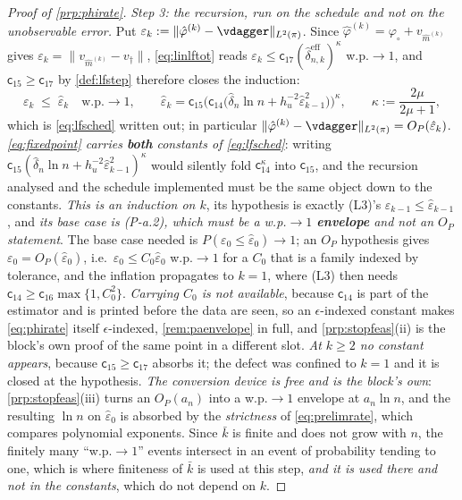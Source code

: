 \begin{proof}[Proof of \cref{prp:phirate}]
\emph{Step 3: the recursion, run on the schedule and not on the unobservable error.} Put
$\varepsilon_k:=\|\hat\varphi^{(k)}-\vdagger\|_{L^{2}(\pi)}$. Since
$\hat\varphi^{(k)}=\varphi_\circ+v_{\hat m^{(k)}}$ gives $\varepsilon_k=\|v_{\hat m^{(k)}}-v_\dagger\|$,
\eqref{eq:linlftot} reads $\varepsilon_k\le\mathsf c_{17}(\hat\delta^{\mathrm{eff}}_{n,k})^{\kappa}$
w.p.$\to1$, and $\mathsf c_{15}\ge\mathsf c_{17}$ by \cref{def:lfstep} therefore closes the induction:
\begin{equation}\label{eq:fixedpoint}
\varepsilon_k\;\le\;\hat\varepsilon_k\quad\text{w.p.}\to1,
\qquad
\hat\varepsilon_k=\mathsf c_{15}\Big(\mathsf c_{14}\big(\hat\delta_n\ln n+h_u^{-2}\hat\varepsilon_{k-1}^{2}\big)\Big)^{\kappa},
\qquad \kappa:=\frac{2\mu}{2\mu+1} ,
\end{equation}
which is \eqref{eq:lfsched} written out; in particular
$\|\hat\varphi^{(k)}-\vdagger\|_{L^{2}(\pi)}=O_P(\hat\varepsilon_k)$.
\emph{\eqref{eq:fixedpoint} carries \textbf{both} constants of \eqref{eq:lfsched}}: writing
$\mathsf c_{15}(\hat\delta_n\ln n+h_u^{-2}\hat\varepsilon_{k-1}^{2})^{\kappa}$ would silently fold
$\mathsf c_{14}^{\kappa}$ into $\mathsf c_{15}$, and the recursion analysed and the
schedule implemented must be the same object down to the constants.
\emph{This is an induction on $k$}, its hypothesis is exactly (L3)'s
$\varepsilon_{k-1}\le\hat\varepsilon_{k-1}$, and \emph{its base case is (P-a.2), which must be a
w.p.$\to1$ \textbf{envelope} and not an $O_P$ statement}. The base case needed is
$P(\varepsilon_0\le\hat\varepsilon_0)\to1$; an $O_P$ hypothesis gives $\varepsilon_0=O_P(\hat\varepsilon_0)$,
i.e.\ $\varepsilon_0\le C_0\hat\varepsilon_0$ w.p.$\to1$ for a $C_0$ that is a family indexed by
tolerance, and the inflation propagates to $k=1$, where (L3) then needs
$\mathsf c_{14}\ge\mathsf c_{16}\max\{1,C_0^{2}\}$. \emph{Carrying $C_0$ is not available}, because
$\mathsf c_{14}$ is part of the estimator and is printed before the data are seen, so an $\epsilon$-indexed
constant makes \eqref{eq:phirate} itself $\epsilon$-indexed, \cref{rem:paenvelope} in full, and
\cref{prp:stopfeas}(ii) is the block's own proof of the same point in a different slot. \emph{At $k\ge2$
no constant appears}, because $\mathsf c_{15}\ge\mathsf c_{17}$ absorbs it; the defect was confined to
$k=1$ and it is closed at the hypothesis. \emph{The conversion device is free and is the block's own}:
\cref{prp:stopfeas}(iii) turns an $O_P(a_n)$ into a w.p.$\to1$ envelope at $a_n\ln n$, and the resulting
$\ln n$ on $\hat\varepsilon_0$ is absorbed by the \emph{strictness} of \eqref{eq:prelimrate}, which
compares polynomial exponents. Since $\bar k$ is finite and does not grow with $n$, the finitely many
``w.p.$\to1$'' events intersect in an event of probability tending to one, which is where finiteness of
$\bar k$ is used at this step, \emph{and it is used there and not in the constants}, which do not
depend on $k$.


\end{proof}
